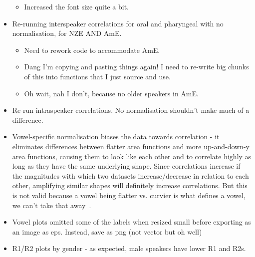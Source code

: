 \documentclass{article}
\begin{document}
\begin{itemize}
\begin{itemize}
        \item Increased the font size quite a bit.
    \end{itemize}
    \item Re-running interspeaker correlations for oral and pharyngeal with no normalisation, for NZE AND AmE.
    \begin{itemize}
        \item Need to rework code to accommodate AmE.
        \item Dang I'm copying and pasting things again! I need to re-write big chunks of this into functions that I just source and use.
        \item Oh wait, nah I don't, because no older speakers in AmE.
    \end{itemize}
    \item Re-run intraspeaker correlations. No normalisation shouldn't make much of a difference. 
    \item Vowel-specific normalisation biases the data towards correlation - it eliminates differences between flatter area functions and more up-and-down-y area functions, causing them to look like each other and to correlate highly as long as they have the same underlying shape. Since correlations increase if the magnitudes with which two datasets increase/decrease in relation to each other, amplifying similar shapes will definitely increase correlations. But this is not valid because a vowel being flatter vs. curvier is what defines a vowel, we can't take that away~.
    \item Vowel plots omitted some of the labels when resized small before exporting as an image as eps. Instead, save as png (not vector but oh well)
    \item R1/R2 plots by gender - as expected, male speakers have lower R1 and R2s.
\end{itemize}
\end{document}
